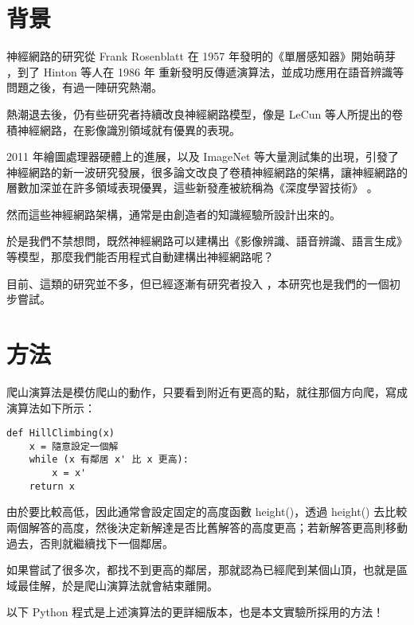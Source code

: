 \documentclass{article}
\begin{document}
\section{背景}

神經網路的研究從 Frank Rosenblatt 在 1957 年發明的《單層感知器》開始萌芽 \cite{Rosenblatt1958ThePA} ，到了 Hinton 等人在 1986 年 \cite{Rumelhart1986LearningRB} 重新發明反傳遞演算法，並成功應用在語音辨識等問題之後，有過一陣研究熱潮。

熱潮退去後，仍有些研究者持續改良神經網路模型，像是 LeCun \cite{LeCun1998GradientbasedLA} 等人所提出的卷積神經網路，在影像識別領域就有優異的表現。

2011 年繪圖處理器硬體上的進展，以及 ImageNet 等大量測試集的出現，引發了神經網路的新一波研究發展，很多論文改良了卷積神經網路的架構，讓神經網路的層數加深並在許多領域表現優異，這些新發產被統稱為《深度學習技術》 \cite{Szegedy2015GoingDW} \cite{Ioffe2015BatchNA} \cite{Chollet2017XceptionDL} 。

然而這些神經網路架構，通常是由創造者的知識經驗所設計出來的。

於是我們不禁想問，既然神經網路可以建構出《影像辨識、語音辨識、語言生成》等模型，那麼我們能否用程式自動建構出神經網路呢？

目前、這類的研究並不多，但已經逐漸有研究者投入 \cite{Mendoza2019TowardsAD} \cite{Abreu2019AutoNN}，本研究也是我們的一個初步嘗試。

\section{方法}

爬山演算法是模仿爬山的動作，只要看到附近有更高的點，就往那個方向爬，寫成演算法如下所示：

\begin{minipage}{\linewidth}
\begin{lstlisting}
def HillClimbing(x)
    x = 隨意設定一個解
    while (x 有鄰居 x' 比 x 更高):
        x = x'
    return x
\end{lstlisting}
\end{minipage}

由於要比較高低，因此通常會設定固定的高度函數 height()，透過 height() 去比較兩個解答的高度，然後決定新解達是否比舊解答的高度更高；若新解答更高則移動過去，否則就繼續找下一個鄰居。

如果嘗試了很多次，都找不到更高的鄰居，那就認為已經爬到某個山頂，也就是區域最佳解，於是爬山演算法就會結束離開。

以下 Python 程式是上述演算法的更詳細版本，也是本文實驗所採用的方法！
\end{document}
